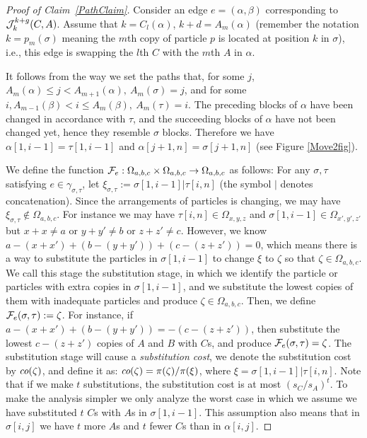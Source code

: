 \documentclass[10 pt]{article}
\newcommand{\J}{{\cal J}}
\begin{document}
\begin{proof}[Proof of Claim~\ref{PathClaim}]


Consider an edge $e=(\alpha,\beta)$ corresponding to ${\J_{k}^{k+g}(C,A)}$. Assume that $k=C_{l}(\alpha)$, $k+d=A_m(\alpha)$
(remember the notation $k=p_{m}(\sigma)$ meaning the $m$th copy of particle $p$ is located at position $k$ in $\sigma$),
i.e., this edge is swapping the $l$th $C$ with the $m$th $A$ in $\alpha$.


It follows from the  way we set the paths that, for some $j$, $A_{m}(\alpha)\leq  j< A_{m{+}1}(\alpha), ~ A_{m}(\sigma)=j$,
and  for some $i , A_{m{-}1}(\beta) < i \leq A_{m}{(\beta)}, ~ A_{m}(\tau)=i$. 
The preceding blocks of $\alpha$ have been changed in accordance with $\tau$, and the succeeding blocks of $\alpha$ have
not been changed yet, hence they resemble $\sigma$ blocks.
Therefore we have $\alpha[1,i{-}1]=\tau[1,i{-}1]$ and $\alpha[j{+}1,n]=\sigma[j{+}1,n]$ (see Figure \ref{Move2fig}).

We define the function ${\cal F}_e:\Omega_{a,b,c}\times \Omega_{a,b,c}\rightarrow\Omega_{a,b,c}$ as follows: 
For any $\sigma,\tau$ satisfying $ e\in \gamma_{\sigma,\tau}$, let $\xi_{\sigma,\tau}:=\sigma[1,i-1]\vert\tau[i,n]$
(the symbol $\vert$ denotes concatenation). Since the arrangements of particles is changing, we may have
$\xi_{\sigma,\tau}\notin\Omega_{a,b,c}$. For instance we may have $\tau[i,n]\in \Omega_{x,y,z}$ and
$\sigma[1,i-1]\in \Omega_{x',y',z'}$ but $x+x\neq a$ or $y+y'\neq b$ or $z+z'\neq c$.
However, we know $a-(x+x')+(b-(y+y'))+(c-(z+z'))=0$, which means there is a way to substitute the particles
in $\sigma[1,i-1]$ to change $\xi$ to $\zeta$ so that $\zeta\in\Omega_{a,b,c}$.
We call this stage the substitution stage, in which we identify the particle or particles with extra copies in $\sigma[1,i-1]$,
and we substitute the lowest copies of them with inadequate particles and produce $\zeta\in \Omega_{a,b,c}$.
Then, we define ${\cal F}_{e}(\sigma,\tau):=\zeta$.
For instance, if  $a-(x+x')+(b-(y+y'))=-(c-(z+z'))$, then substitute the lowest $c-(z+z')$ copies of $A$ and
$B$ with $C$s, and produce ${\cal F}_{e}(\sigma,\tau)=\zeta$.
The substitution stage will cause a \emph{substitution cost}, we denote the substitution cost by $\emph{co}(\zeta)$,
and define it as: $\emph{co}(\zeta)=\pi(\zeta)/\pi(\xi)$, where  $\xi=\sigma[1,i-1]\vert\tau[i,n]$. Note that
if we make $t$ substitutions, the substitution cost is at most $(s_C/s_A)^t$.
To make the analysis simpler we only analyze the worst case in which we assume we have substituted $t$
$C$s with $A$s in $\sigma[1,i-1]$. This assumption also means that in $\sigma[i,j]$ we have $t$ more $A$s and $t$ fewer $C$s than in $\alpha[i,j]$.  


\end{proof}
\end{document}
